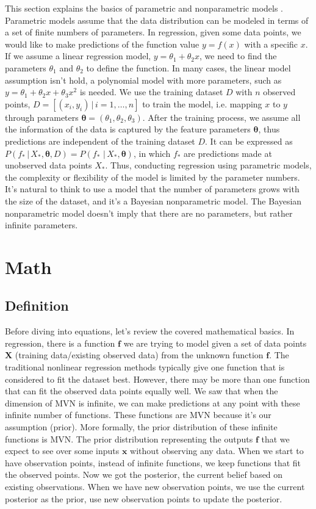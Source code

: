 \documentclass[12pt,letterpaper,fleqn,oneside,titlepage]{offroad-report}
\begin{document}
This section explains the basics of parametric and nonparametric models \cite{Murphy2012}. Parametric models assume that the data distribution can be modeled in terms of a set of finite numbers of parameters. In regression, given some data points, we would like to make predictions of the function value $y=f(x)$ with a specific $x$. If we assume a linear regression model, $y = \theta_1  + \theta_2 x$, we need to find the parameters $\theta_1$ and $\theta_2$ to define the function. In many cases, the linear model assumption isn’t hold, a polynomial model with more parameters, such as $y = \theta_1+\theta_2 x+\theta_3 x^2$ is needed. We use the training dataset $D$ with $n$ observed points, $D=[(x_i,y_i)\, \vert \, i=1,…,n]$ to train the model, i.e. mapping $x$ to $y$ through parameters $ \boldsymbol {\theta}= (\theta_1,\theta_2,\theta_3)$. After the training process, we assume all the information of the data is captured by the feature parameters $\boldsymbol {\theta}$, thus predictions are independent of the training dataset $D$. It can be expressed as  $P(f_* \, \vert \,  X_*, \boldsymbol {\theta} ,D)=P(f_* \, \, \vert \,  X_*, \boldsymbol {\theta})$, in which $f_*$ are predictions made at unobserved data points $X_*$. Thus, conducting regression using parametric models, the complexity or flexibility of the model is limited by the parameter numbers. It’s natural to think to use a model that the number of parameters grows with the size of the dataset, and it’s a Bayesian nonparametric model. The Bayesian nonparametric model doesn't imply that there are no parameters, but rather infinite parameters. 

\section{Math}

\subsection{Definition}
Before diving into equations, let's review the covered mathematical basics. In regression, there is a function $\mathbf{f}$ we are trying to model given a set of data points $\mathbf{X}$ (training data/existing observed data) from the unknown function $\mathbf{f}$. The traditional nonlinear regression methods typically give one function that is considered to fit the dataset best. However, there may be more than one function that can fit the observed data points equally well. We saw that when the dimension of MVN is infinite, we can make predictions at any point with these infinite number of functions. These functions are MVN because it's our assumption (prior). More formally, the prior distribution of these infinite functions is MVN. The prior distribution representing the outputs $\mathbf{f}$ that we expect to see over some inputs $\mathbf{x}$ without observing any data. When we start to have observation points, instead of infinite functions, we keep functions that fit the observed points. Now we got the posterior, the current belief based on existing observations. When we have new observation points, we use the current posterior as the prior, use new observation points to update the posterior.  
\end{document}
